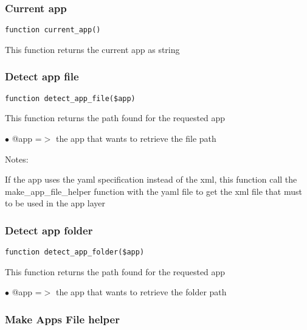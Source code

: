 \documentclass[a4paper]{article}
\begin{document}
\hypertarget{toc45}{}
\subsubsection{Current app}

\begin{lstlisting}
function current_app()
\end{lstlisting}

This function returns the current app as string

\hypertarget{toc46}{}
\subsubsection{Detect app file}

\begin{lstlisting}
function detect_app_file($app)
\end{lstlisting}

This function returns the path found for the requested app

\begin{compactitem}
\item[\color{myblue}$\bullet$] @app =$>$ the app that wants to retrieve the file path
\end{compactitem}

Notes:

If the app uses the yaml specification instead of the xml, this
function call the make\_app\_file\_helper function with the yaml file
to get the xml file that must to be used in the app layer

\hypertarget{toc47}{}
\subsubsection{Detect app folder}

\begin{lstlisting}
function detect_app_folder($app)
\end{lstlisting}

This function returns the path found for the requested app

\begin{compactitem}
\item[\color{myblue}$\bullet$] @app =$>$ the app that wants to retrieve the folder path
\end{compactitem}

\hypertarget{toc48}{}
\subsubsection{Make Apps File helper}
\end{document}
